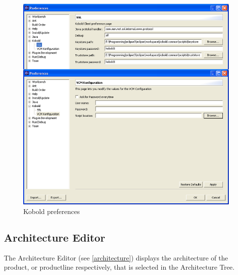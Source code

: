 \begin{figure}[h!]
\begin{center}
\includegraphics[width=14cm]{pref.png}
   \caption{Kobold preferences}
\label{pref}
\end{center}
\end{figure}\par



\subsection{Architecture Editor}

The Architecture Editor (see \ref{architecture}) displays the architecture of the product,
or productline respectively, that is selected in the Architecture Tree. \par

